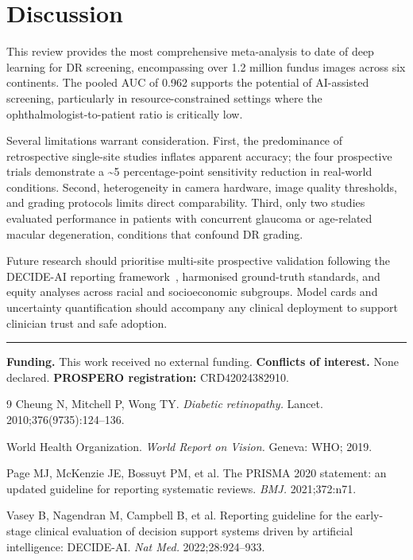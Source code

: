 \section{Discussion}

This review provides the most comprehensive meta-analysis to date of deep learning for
DR screening, encompassing over 1.2 million fundus images across six continents.
The pooled AUC of 0.962 supports the potential of AI-assisted screening, particularly in
resource-constrained settings where the ophthalmologist-to-patient ratio is critically low.

Several limitations warrant consideration. First, the predominance of retrospective
single-site studies inflates apparent accuracy; the four prospective trials demonstrate
a \textasciitilde{}5 percentage-point sensitivity reduction in real-world conditions.
Second, heterogeneity in camera hardware, image quality thresholds, and grading protocols
limits direct comparability. Third, only two studies evaluated performance in patients
with concurrent glaucoma or age-related macular degeneration, conditions that confound
DR grading.

Future research should prioritise multi-site prospective validation following the
DECIDE-AI reporting framework~\cite{Vasey2022}, harmonised ground-truth standards, and
equity analyses across racial and socioeconomic subgroups. Model cards and uncertainty
quantification should accompany any clinical deployment to support clinician trust
and safe adoption.

\vspace{3mm}
{\color{lightrule}\rule{\linewidth}{0.4pt}}

\textbf{Funding.} This work received no external funding.
\textbf{Conflicts of interest.} None declared.
\textbf{PROSPERO registration:} CRD42024382910.

\begin{thebibliography}{9}
\setlength{\itemsep}{2pt}
  Cheung N, Mitchell P, Wong TY.
  \textit{Diabetic retinopathy.}
  Lancet. 2010;376(9735):124–136.

  World Health Organization.
  \textit{World Report on Vision.}
  Geneva: WHO; 2019.

  Page MJ, McKenzie JE, Bossuyt PM, et al.
  The PRISMA 2020 statement: an updated guideline for reporting systematic reviews.
  \textit{BMJ.} 2021;372:n71.

  Vasey B, Nagendran M, Campbell B, et al.
  Reporting guideline for the early-stage clinical evaluation of decision support
  systems driven by artificial intelligence: DECIDE-AI.
  \textit{Nat Med.} 2022;28:924–933.
\end{thebibliography}
